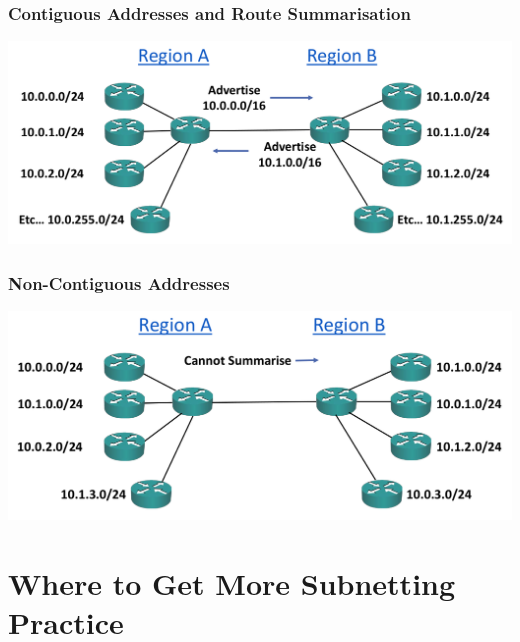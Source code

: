 \documentclass[pdflatex,compress]{beamer}
\begin{document}
\begin{frame}
	\frametitle{Contiguous Addresses and Route Summarisation}
	\begin{center}
		\includegraphics[width=\linewidth]{img/img30}
	\end{center}
\end{frame}

\begin{frame}
	\frametitle{Non-Contiguous Addresses}
	\begin{center}
		\includegraphics[width=\linewidth]{img/img31}
	\end{center}
\end{frame}

\section{Where to Get More Subnetting Practice}
\end{document}
